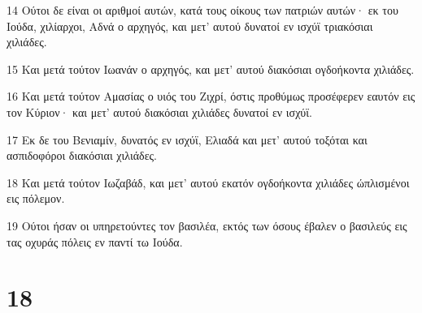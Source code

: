 \par 14 Ούτοι δε είναι οι αριθμοί αυτών, κατά τους οίκους των πατριών αυτών· εκ του Ιούδα, χιλίαρχοι, Αδνά ο αρχηγός, και μετ' αυτού δυνατοί εν ισχύϊ τριακόσιαι χιλιάδες.
\par 15 Και μετά τούτον Ιωανάν ο αρχηγός, και μετ' αυτού διακόσιαι ογδοήκοντα χιλιάδες.
\par 16 Και μετά τούτον Αμασίας ο υιός του Ζιχρί, όστις προθύμως προσέφερεν εαυτόν εις τον Κύριον· και μετ' αυτού διακόσιαι χιλιάδες δυνατοί εν ισχύϊ.
\par 17 Εκ δε του Βενιαμίν, δυνατός εν ισχύϊ, Ελιαδά και μετ' αυτού τοξόται και ασπιδοφόροι διακόσιαι χιλιάδες.
\par 18 Και μετά τούτον Ιωζαβάδ, και μετ' αυτού εκατόν ογδοήκοντα χιλιάδες ώπλισμένοι εις πόλεμον.
\par 19 Ούτοι ήσαν οι υπηρετούντες τον βασιλέα, εκτός των όσους έβαλεν ο βασιλεύς εις τας οχυράς πόλεις εν παντί τω Ιούδα.

\chapter{18}

